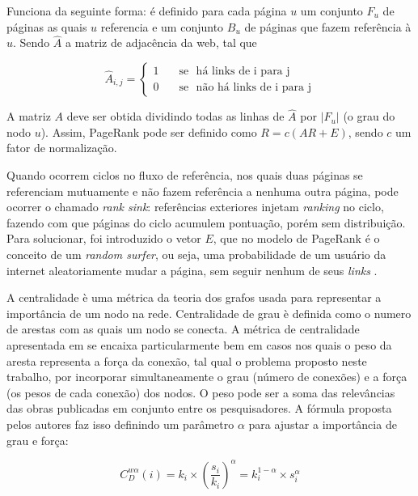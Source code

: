 \documentclass[12pt]{article}
\begin{document}
Funciona da seguinte forma: é definido para cada página $u$ um conjunto $F_u$ de páginas as quais $u$ referencia e um conjunto $B_u$ de páginas que fazem referência à $u$. Sendo $\hat{A}$ a matriz de adjacência da web, tal que 

\begin{equation} \label{eqn:adjacency-matrix}
   \hat{A}_{i,j} =
    \begin{cases}
      1       & \quad \text{se } \text{ há links de i para j}\\
      0       & \quad \text{se } \text{ não há links de i para j}
    \end{cases}
\end{equation}

A matriz $A$ deve ser obtida dividindo todas as linhas de $\hat{A}$ por $|F_u|$ (o grau do nodo $u$). Assim, PageRank pode ser definido 
como $R = c(AR + E)$, sendo $c$ um fator de normalização.

Quando ocorrem ciclos no fluxo de referência, nos quais duas páginas se referenciam mutuamente e não fazem referência a nenhuma 
outra página, pode ocorrer o chamado \textit{rank sink}: referências exteriores injetam \textit{ranking} no ciclo, 
fazendo com que páginas do ciclo acumulem pontuação, porém sem distribuição. Para solucionar, foi introduzido o vetor $E$, que no modelo 
de PageRank é o conceito de um \textit{random surfer}, ou seja, uma probabilidade de um usuário da internet aleatoriamente mudar a página, sem seguir nenhum de seus \textit{links} \cite{page1999pagerank}.

A centralidade è uma métrica da teoria dos grafos usada para representar a importância de um nodo na rede. Centralidade de grau è definida como o numero de arestas com as quais um nodo se conecta. A métrica de centralidade apresentada em \cite{opsahl2010node} 
se encaixa particularmente bem em casos nos quais o peso da aresta representa a força da conexão, tal qual o problema proposto neste trabalho, por incorporar simultaneamente o grau (número de conexões) e a força (os pesos de cada conexão) dos nodos. O peso pode ser a soma das relevâncias das obras publicadas em conjunto entre os pesquisadores. A fórmula proposta pelos autores faz isso definindo um parâmetro $\alpha$ para ajustar a importância de grau e força:

\begin{equation} \label{eqn:centrality} 
 C_D ^{w \alpha} (i) = k_i \times \left( \frac {s_i} {k_i} \right) ^{\alpha} = k_i ^{1 - \alpha} \times s _i ^{\alpha}
\end{equation}
\end{document}
